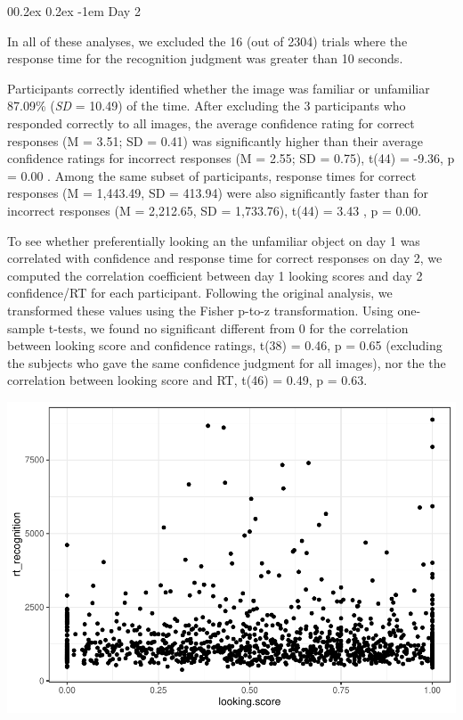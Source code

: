 \documentclass[
  man,floatsintext]{apa6}
\makeatletter
\let\oldparagraph\paragraph
\renewcommand{\paragraph}[1]{\oldparagraph{#1}\mbox{}}
\renewcommand{\paragraph}{\@startsection{paragraph}{4}{\parindent}%
  {0\baselineskip \@plus 0.2ex \@minus 0.2ex}%
  {-1em}%
  {\normalfont\normalsize\bfseries\itshape\typesectitle}}
\makeatother
\begin{document}
\hypertarget{day-2}{%
\paragraph{Day 2}\label{day-2}}

In all of these analyses, we excluded the 16 (out of 2304) trials where the response time for the recognition judgment was greater than 10 seconds.

Participants correctly identified whether the image was familiar or unfamiliar 87.09\% (\emph{SD} = 10.49) of the time. After excluding the 3 participants who responded correctly to all images, the average confidence rating for correct responses (M = 3.51; SD = 0.41) was significantly higher than their average confidence ratings for incorrect responses (M = 2.55; SD = 0.75), t(44) = -9.36, p = 0.00 . Among the same subset of participants, response times for correct responses (M = 1,443.49, SD = 413.94) were also significantly faster than for incorrect responses (M = 2,212.65, SD = 1,733.76), t(44) = 3.43 , p = 0.00.

To see whether preferentially looking an the unfamiliar object on day 1 was correlated with confidence and response time for correct responses on day 2, we computed the correlation coefficient between day 1 looking scores and day 2 confidence/RT for each participant. Following the original analysis, we transformed these values using the Fisher p-to-z transformation. Using one-sample t-tests, we found no significant different from 0 for the correlation between looking score and confidence ratings, t(38) = 0.46, p = 0.65 (excluding the subjects who gave the same confidence judgment for all images), nor the the correlation between looking score and RT, t(46) = 0.49, p = 0.63.

\includegraphics{manuscript_files/figure-latex/Plot Looking Score Correlations-1.pdf}
\end{document}
